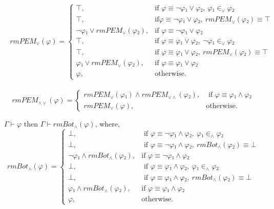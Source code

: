 \documentclass[../main.tex]{subfiles}
\begin{document}
\begin{lemma}
  \label{lem:lem-rmPEM-or}
  \begin{align*}
  \label{eq:rmPEM-or}
    \begin{split}
    rmPEM_{∨}(φ) =
      \begin{cases}
        ⊤, &\text{if }φ ≡ ¬ φ₁ ∨ φ₂,\ φ₁ ∈_{∨} φ₂\\
        ⊤, &\text{if}φ ≡ ¬ φ₁ ∨ φ₂,\ rmPEM_{∨}(φ₂) ≡ ⊤\\
        ¬ φ₁ ∨ rmPEM_{∨}(φ₂), &\text{if }φ ≡ ¬ φ₁ ∨ φ₂\\
        ⊤, &\text{if }φ ≡ φ₁ ∨ φ₂,\ ¬φ₁ ∈_{∨} φ₂ \\
        ⊤, &\text{if }φ ≡ φ₁ ∨ φ₂,\ rmPEM_{∨}(φ₂) ≡ ⊤\\
        φ₁ ∨ rmPEM_{∨}(φ₂), &\text{if }φ ≡ φ₁ ∨ φ₂\\
        φ, &\text{otherwise.}
      \end{cases}
    \end{split}
  \end{align*}
\end{lemma}

\begin{lemma}
  \label{lem:lem-rmPEM-and-or}
  \begin{equation*}
    \label{eq:rmPEM-and-or}
    rmPEM_{∧∨}(φ) =
    \begin{cases}
      rmPEM_{∨}(φ₁) ∧ rmPEM_{∨∧}(φ₂), &\text{ if }φ ≡ φ₁ ∧ φ₂\\
      rmPEM_{∨}(φ), &\text{otherwise.}
    \end{cases}
  \end{equation*}
\end{lemma}

\begin{lemma}
  \label{lem:lem-rmbot-and}
   $Γ ⊢ φ$ then $Γ ⊢ rmBot_{∧}(φ)$, where,
  \begin{equation*}
    \label{eq:rmBot-and}
    rmBot_{∧}(φ) =
    \begin{cases}
      ⊥, &\text{ if }φ ≡ ¬ φ₁ ∧ φ₂,\ φ₁ ∈_{∧} φ₂\\
      ⊥, &\text{ if }φ ≡ ¬ φ₁ ∧ φ₂,\ rmBot_{∧}(φ₂) ≡ ⊥\\
      ¬ φ₁ ∧ rmBot_{∧}(φ₂), &\text{if }φ ≡ ¬ φ₁ ∧ φ₂\\
      ⊥, &\text{ if }φ ≡ φ₁ ∧ φ₂,\ φ₁ ∈_{∧} φ₂\\
      ⊥, &\text{ if }φ ≡ φ₁ ∧ φ₂,\ rmBot_{∧}(φ₂) ≡ ⊥\\
      φ₁ ∧ rmBot_{∧}(φ₂), &\text{if }φ ≡ φ₁ ∧ φ₂\\
      φ, &\text{otherwise.}
    \end{cases}
  \end{equation*}
\end{lemma}
\end{document}
